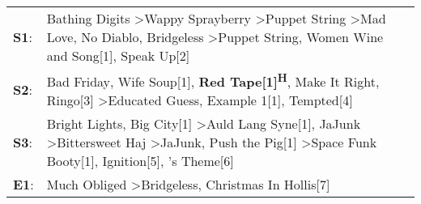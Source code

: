 \begin{supertabular}{p{0.03\textwidth}p{0.92\textwidth}}
 \textbf{S1}:  &              Bathing Digits\textsuperscript{} \textgreater \enspace Wappy Sprayberry\textsuperscript{} \textgreater \enspace Puppet String\textsuperscript{} \textgreater \enspace Mad Love\textsuperscript{}, \enspace No Diablo\textsuperscript{}, \enspace Bridgeless\textsuperscript{} \textgreater \enspace Puppet String\textsuperscript{}, \enspace Women Wine and Song[1]\textsuperscript{}, \enspace Speak Up[2]\textsuperscript{}  \enspace  \\
 \textbf{S2}:  &                                                                                               Bad Friday\textsuperscript{}, \enspace Wife Soup[1]\textsuperscript{}, \enspace \textbf{Red Tape[1]\textsuperscript{H}}, \enspace Make It Right\textsuperscript{}, \enspace Ringo[3]\textsuperscript{} \textgreater \enspace Educated Guess\textsuperscript{}, \enspace Example 1[1]\textsuperscript{}, \enspace Tempted[4]\textsuperscript{}  \enspace  \\
 \textbf{S3}:  &  Bright Lights, Big City[1]\textsuperscript{} \textgreater \enspace Auld Lang Syne[1]\textsuperscript{}, \enspace JaJunk\textsuperscript{} \textgreater \enspace Bittersweet Haj\textsuperscript{} \textgreater \enspace JaJunk\textsuperscript{}, \enspace Push the Pig[1]\textsuperscript{} \textgreater \enspace Space Funk Booty[1]\textsuperscript{}, \enspace Ignition[5]\textsuperscript{}, 's Theme[6]\textsuperscript{}  \enspace  \\
 \textbf{E1}:  &                                                                                                                                                                                                                                                                                                        Much Obliged\textsuperscript{} \textgreater \enspace Bridgeless\textsuperscript{}, \enspace Christmas In Hollis[7]\textsuperscript{}  \enspace  \\
\end{supertabular}
